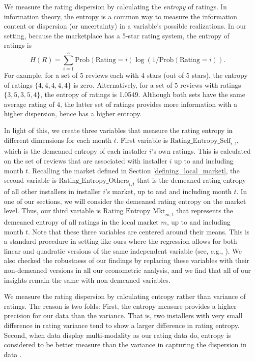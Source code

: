 \documentclass[msom,blindrev]{informs3}
\begin{document}
	We measure the rating dispersion by calculating the \emph{entropy} of ratings. In information theory, the entropy is a common way to measure the information content or dispersion (or uncertainty) in a variable's possible realizations. In our setting, because the marketplace has a 5-star rating system, the entropy of ratings is
	\begin{equation}\label{def: entropy}
	H(R)= \sum_{i=1}^{5} \text{Prob}(\text{Rating}=i) \log(1/\text{Prob}(\text{Rating}=i)).
	\end{equation}
	For example, for a set of 5 reviews each with 4 stars (out of 5 stars), the entropy of ratings $\{4,4,4,4,4\}$ is zero. Alternatively, for a set of 5 reviews with ratings $\{3,5,3,5,4\}$, the entropy of ratings is 1.0549. Although both sets have the same average rating of 4, the latter set of ratings provides more information with a higher dispersion, hence has a higher entropy.
	
	
	In light of this, we create three variables that measure the rating entropy in different dimensions for each month $t$. First variable is $\text{Rating\_Entropy\_Self}_{i,t}$, which is the demeaned entropy of each installer $i$'s own ratings. This is calculated on the set of reviews that are associated with installer $i$ up to and including month $t$. Recalling the market defined in Section \ref{defining_local_market}, the second variable is $\text{Rating\_Entropy\_Others}_{i,t}$ that is the demeaned rating entropy of all other installers in installer $i$'s market, up to and and including month $t$. In one of our sections, we will consider the demeaned rating entropy on the market level. Thus, our third variable is $\text{Rating\_Entropy\_Mkt}_{m,t}$ that represents the demeaned entropy of all ratings in the local market $m$, up to and including month $t$. Note that these three variables are centered around their means. This is a standard procedure in setting like ours where the regression allows for both linear and quadratic versions of the same independent variable (see, e.g., \cite{tan2014does}). We also checked the robustness of our findings by replacing these variables with their non-demeaned versions in all our econometric analysis, and we find that all of our insights remain the same with non-demeaned variables.
	
	We measure the rating dispersion by calculating entropy rather than variance of ratings. The reason is two folds: First, the entropy measure provides a higher precision for our data than the variance. That is, two installers with very small difference in rating variance tend to show a larger difference in rating
entropy. Second, when data display multi-modality as our rating data do, entropy is considered to be better measure than the variance in capturing the dispersion in data \citep{smaldino2013measures}.
	
\end{document}
